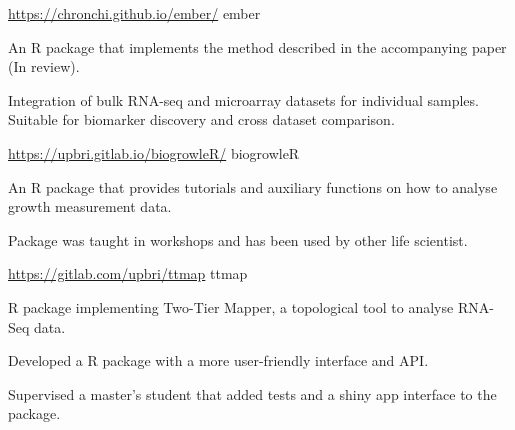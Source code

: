 

\begin{cventries}

\cventry
  {\url{https://chronchi.github.io/ember/}} %
  {ember} %
  {}{}
  {
    \begin{cvitems} %
      \item {An R package that implements the method described in 
             the accompanying paper (In review).}
      \item {Integration of bulk RNA-seq and microarray datasets
             for individual samples. Suitable for biomarker
             discovery and cross dataset comparison.} 
    \end{cvitems}
  }


\cventry
  {\url{https://upbri.gitlab.io/biogrowleR/}} %
  {biogrowleR} %
  {}{}
  {
    \begin{cvitems} %
      \item {An R package that provides tutorials and auxiliary 
             functions on how to analyse growth measurement data.}
      \item {Package was taught in workshops and has been used by
            other life scientist.}
    \end{cvitems}
  }


\cventry
  {\url{https://gitlab.com/upbri/ttmap}} %
  {ttmap} %
  {}{}
  {
    \begin{cvitems} %
      \item {R package implementing Two-Tier Mapper, a 
             topological tool to analyse RNA-Seq data.}
      \item {Developed a R package with a more user-friendly interface and API.}
      \item {Supervised a master's student that added tests and a shiny app interface
            to the package.} 
    \end{cvitems}
  }



\end{cventries}
